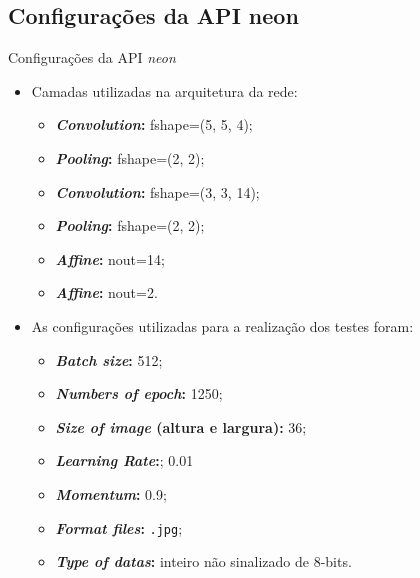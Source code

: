 \documentclass[aspectratio=169, xcolor=dvipsnames]{beamer}
\let\olditem=\item%
\renewcommand{\item}{\olditem \justifying}
\begin{document}
	\subsection{Configurações da API neon}
		\begin{frame}{Configurações da API \textit{neon}}
			\begin{multicols*}{2}
				\begin{itemize}
					\item Camadas utilizadas na arquitetura da rede:
					\begin{itemize}
						\setlength\itemsep{0.7em}
						\item \textbf{\textit{Convolution}:} fshape=(5, 5, 4);
						\item \textbf{\textit{Pooling}:} fshape=(2, 2);
						\item \textbf{\textit{Convolution}:} fshape=(3, 3, 14);
						\item \textbf{\textit{Pooling}:} fshape=(2, 2);
						\item \textbf{\textit{Affine}:} nout=14;
						\item \textbf{\textit{Affine}:} nout=2.
					\end{itemize}
					
					\bigskip
					
					\item As configurações utilizadas para a realização dos testes foram:
					
					\begin{itemize}
						\setlength\itemsep{0.3em}
						\item \textbf{\textit{Batch size}:} 512;
						\item \textbf{\textit{Numbers of epoch}:} 1250;
						\item \textbf{\textit{Size of image} (altura e largura):} 36;
						\item \textbf{\textit{Learning Rate}:}; 0.01
						\item \textbf{\textit{Momentum}:} 0.9;
						\item \textbf{\textit{Format files}:} \texttt{.jpg};
						\item \textbf{\textit{Type of datas}:} inteiro não sinalizado de 8-bits.
					\end{itemize}
				\end{itemize}
		\end{multicols*}
		\end{frame}
\end{document}
